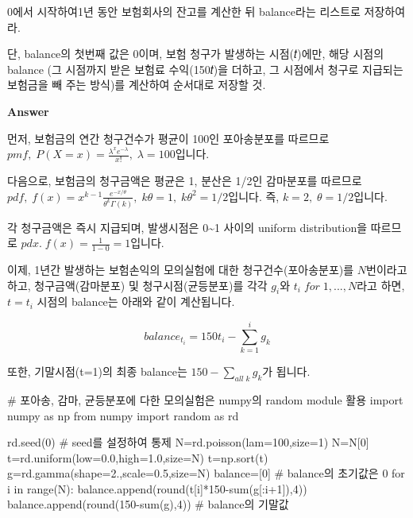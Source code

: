 \documentclass[
  a4paper,
  DIV=11,
  numbers=noendperiod]{scrreprt}
\newenvironment{Shaded}{\begin{snugshade}}{\end{snugshade}}
\newcommand{\BuiltInTok}[1]{\textcolor[rgb]{0.00,0.23,0.31}{#1}}
\newcommand{\CommentTok}[1]{\textcolor[rgb]{0.37,0.37,0.37}{#1}}
\newcommand{\ControlFlowTok}[1]{\textcolor[rgb]{0.00,0.23,0.31}{#1}}
\newcommand{\DecValTok}[1]{\textcolor[rgb]{0.68,0.00,0.00}{#1}}
\newcommand{\FloatTok}[1]{\textcolor[rgb]{0.68,0.00,0.00}{#1}}
\newcommand{\ImportTok}[1]{\textcolor[rgb]{0.00,0.46,0.62}{#1}}
\newcommand{\KeywordTok}[1]{\textcolor[rgb]{0.00,0.23,0.31}{#1}}
\newcommand{\NormalTok}[1]{\textcolor[rgb]{0.00,0.23,0.31}{#1}}
\newcommand{\OperatorTok}[1]{\textcolor[rgb]{0.37,0.37,0.37}{#1}}
\begin{document}
0에서 시작하여1년 동안 보험회사의 잔고를 계산한 뒤 balance라는 리스트로
저장하여라.

단, balance의 첫번째 값은 0이며, 보험 청구가 발생하는 시점(𝑡)에만, 해당
시점의 balance (그 시점까지 받은 보험료 수익(150𝑡)을 더하고, 그 시점에서
청구로 지급되는 보험금을 빼 주는 방식)를 계산하여 순서대로 저장할 것.

\textbf{Answer}

먼저, 보험금의 연간 청구건수가 평균이 100인 포아송분포를 따르므로
\(pmf,\;P(X=x)=\frac{\lambda^xe^{-\lambda}}{x!},\;\lambda=100\)입니다.

다음으로, 보험금의 청구금액은 평균은 1, 분산은 1/2인 감마분포를 따르므로
\(pdf,\;f(x)=x^{k-1}\frac{e^{-x/\theta}}{\theta^k\Gamma(k)},\;k\theta=1,\;k\theta^2=1/2\)입니다.
즉, \(k=2,\;\theta=1/2\)입니다.

각 청구금액은 즉시 지급되며, 발생시점은 0\textasciitilde1 사이의 uniform
distribution을 따르므로 \(pdx.\;f(x)=\frac{1}{1-0}=1\)입니다.

이제, 1년간 발생하는 보험손익의 모의실험에 대한 청구건수(포아송분포)를
\(N\)번이라고 하고, 청구금액(감마분포) 및 청구시점(균등분포)를 각각
\(g_i\)와 \(t_i\; for\; 1,...,N\)라고 하면, \(t=t_i\) 시점의 balance는
아래와 같이 계산됩니다.

\[{balance}_{t_i}=150t_i-\sum_{k=1}^{i}g_k\]

또한, 기말시점(t=1)의 최종 balance는 \(150-\sum_{all\;k}g_k\)가 됩니다.

\begin{Shaded}
\begin{Highlighting}[]
\CommentTok{\# 포아송, 감마, 균등분포에 다한 모의실험은 numpy의 random module 활용}
\ImportTok{import}\NormalTok{ numpy }\ImportTok{as}\NormalTok{ np}
\ImportTok{from}\NormalTok{ numpy }\ImportTok{import}\NormalTok{ random }\ImportTok{as}\NormalTok{ rd}


\NormalTok{rd.seed(}\DecValTok{0}\NormalTok{) }\CommentTok{\# seed를 설정하여 통제}
\NormalTok{N}\OperatorTok{=}\NormalTok{rd.poisson(lam}\OperatorTok{=}\DecValTok{100}\NormalTok{,size}\OperatorTok{=}\DecValTok{1}\NormalTok{)}
\NormalTok{N}\OperatorTok{=}\NormalTok{N[}\DecValTok{0}\NormalTok{]}
\NormalTok{t}\OperatorTok{=}\NormalTok{rd.uniform(low}\OperatorTok{=}\FloatTok{0.0}\NormalTok{,high}\OperatorTok{=}\FloatTok{1.0}\NormalTok{,size}\OperatorTok{=}\NormalTok{N)}
\NormalTok{t}\OperatorTok{=}\NormalTok{np.sort(t)}
\NormalTok{g}\OperatorTok{=}\NormalTok{rd.gamma(shape}\OperatorTok{=}\FloatTok{2.}\NormalTok{,scale}\OperatorTok{=}\FloatTok{0.5}\NormalTok{,size}\OperatorTok{=}\NormalTok{N)}
\NormalTok{balance}\OperatorTok{=}\NormalTok{[}\DecValTok{0}\NormalTok{] }\CommentTok{\# balance의 초기값은 0}
\ControlFlowTok{for}\NormalTok{ i }\KeywordTok{in} \BuiltInTok{range}\NormalTok{(N):}
\NormalTok{    balance.append(}\BuiltInTok{round}\NormalTok{(t[i]}\OperatorTok{*}\DecValTok{150}\OperatorTok{{-}}\BuiltInTok{sum}\NormalTok{(g[:i}\OperatorTok{+}\DecValTok{1}\NormalTok{]),}\DecValTok{4}\NormalTok{))}
\NormalTok{balance.append(}\BuiltInTok{round}\NormalTok{(}\DecValTok{150}\OperatorTok{{-}}\BuiltInTok{sum}\NormalTok{(g),}\DecValTok{4}\NormalTok{)) }\CommentTok{\# balance의 기말값}
\end{Highlighting}
\end{Shaded}
\end{document}
